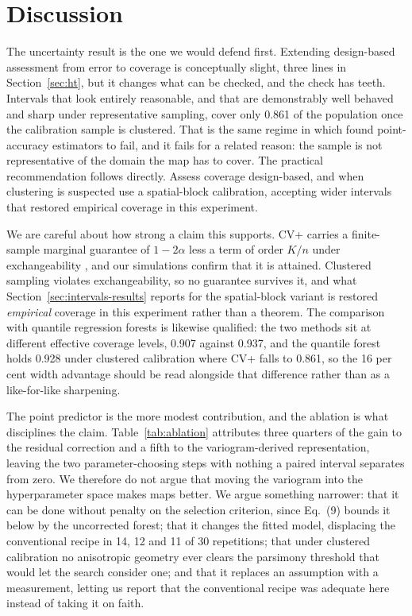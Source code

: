 \documentclass[preprint,12pt,authoryear]{elsarticle}
\begin{document}
\section{Discussion}

The uncertainty result is the one we would defend first. Extending design-based
assessment from error to coverage is conceptually slight, three lines in
Section~\ref{sec:ht}, but it changes what can be checked, and the check has
teeth. Intervals that look entirely reasonable, and that are demonstrably
well behaved and sharp under representative sampling, cover only 0.861 of the
population once the calibration sample is clustered. That is the same regime in
which \citet{wadoux2021} found point-accuracy estimators to fail, and it fails
for a related reason: the sample is not representative of the domain the map has
to cover. The practical recommendation follows directly. Assess coverage
design-based, and when clustering is suspected use a spatial-block calibration,
accepting wider intervals that restored empirical coverage in this experiment.

We are careful about how strong a claim this supports. CV+ carries a
finite-sample marginal guarantee of $1-2\alpha$ less a term of order $K/n$ under
exchangeability
\citep{barber2021}, and our simulations confirm that it is attained. Clustered
sampling violates exchangeability, so no guarantee survives it, and what
Section~\ref{sec:intervals-results} reports for the spatial-block variant is
restored \emph{empirical} coverage in this experiment rather than a theorem. The
comparison with quantile regression forests is likewise qualified: the two
methods sit at different effective coverage levels, 0.907 against 0.937, and the
quantile forest holds 0.928 under clustered calibration where CV+ falls to
0.861, so the
16 per cent width advantage should be read alongside that difference rather than
as a like-for-like sharpening.

The point predictor is the more modest contribution, and the ablation is what
disciplines the claim. Table~\ref{tab:ablation} attributes three quarters of
the gain to the residual correction and a fifth to the variogram-derived
representation, leaving the two parameter-choosing steps with nothing a paired
interval separates from zero. We therefore do not argue that moving the variogram into the
hyperparameter space makes maps better. We argue something narrower: that it can
be done without penalty on the selection criterion, since Eq.~(9) bounds it
below by the uncorrected
forest; that it changes the fitted model, displacing the conventional recipe in
14, 12 and 11 of 30 repetitions; that under clustered calibration no anisotropic
geometry ever clears the parsimony threshold that would let the search consider
one; and that it replaces an assumption with a
measurement, letting us report that the conventional recipe was adequate here
instead of taking it on faith.
\end{document}
